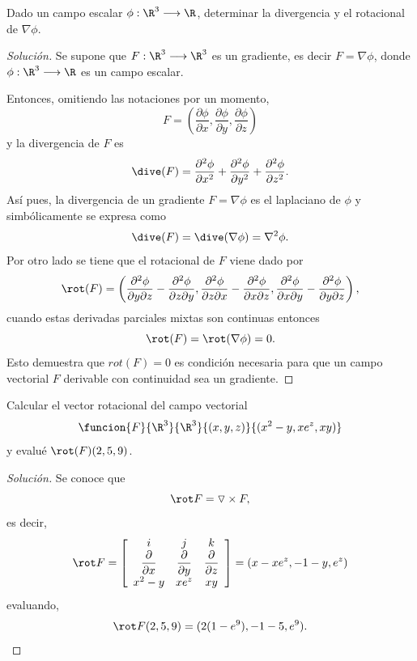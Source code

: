 \documentclass[a4,11pt]{aleph-notas}
\begin{document}
\begin{ejer}
Dado un campo escalar $\phi:\R^3 \longrightarrow \R$, determinar la divergencia y el rotacional de $\nabla \phi$.
\end{ejer}

\begin{proof}[Solución]
Se supone que $F:\R^3 \longrightarrow \R^3$ es un gradiente, es decir $F=\nabla \phi $, donde $\phi:\R^3 \longrightarrow \R$ es un campo escalar.  
    
    Entonces, omitiendo las notaciones por un momento,
    \[
    F=\left( \frac{\partial \phi}{\partial x},\frac{\partial \phi}{\partial y},\frac{\partial \phi}{\partial z} \right)
    \]
    y la divergencia de $F$ es
    \[
    \dive(F)=\frac{\partial^2 \phi}{\partial x^2}+\frac{\partial^2 \phi}{\partial y^2}+\frac{\partial^2 \phi}{\partial z^2} .
    \]
    Así pues, la divergencia de un gradiente $F=\nabla \phi$ es el laplaciano de $\phi$ y simbólicamente se expresa como
    \[
    \dive(F)=\dive(\nabla \phi)=\nabla ^2 \phi.
    \]
    Por otro lado se tiene que el rotacional de $F$ viene dado por
    \[
    \rot(F)=\left( \frac{\partial^2 \phi}{\partial y \partial z}-\frac{\partial^2 \phi}{\partial z \partial y},\frac{\partial^2 \phi}{\partial z \partial x}-\frac{\partial^2 \phi}{\partial x \partial z},\frac{\partial^2 \phi}{\partial x \partial y}-\frac{\partial^2 \phi}{\partial y \partial z} \right), 
    \]
    cuando estas derivadas parciales mixtas son continuas entonces 
    \[
    \rot(F)=\rot(\nabla \phi)=0.
    \]
    Esto demuestra que $rot(F)=0$ es condición necesaria para que un campo vectorial $F$  derivable con continuidad sea un gradiente.
\end{proof}

\begin{ejer}
Calcular el vector rotacional del campo vectorial
    \[
        \funcion{F}{\R^3}{\R^3}{(x,y,z)}{(x^2-y,xe^z,xy)}
    \]
    y evalué $\rot(F)(2,5,9)$.
\end{ejer}

\begin{proof}[Solución]
Se conoce que
    \[
    \rot F= \triangledown \times F,
    \]
    es decir,
    \[
        \rot F=
        \left[
        \begin{array}{ccc}
		i & j & k \\
		\dfrac{\partial}{\partial x} & \dfrac{\partial}{\partial y} & \dfrac{\partial}{\partial z}\\
        x^2-y & xe^z & xy
        \end{array} 
        \right]
        =(x-xe^z,-1-y,e^z)
    \]
    evaluando,
    \[
    \rot F(2,5,9)=(2(1-e^9), -1-5, e^9).
    \]
\end{proof}
\end{document}

